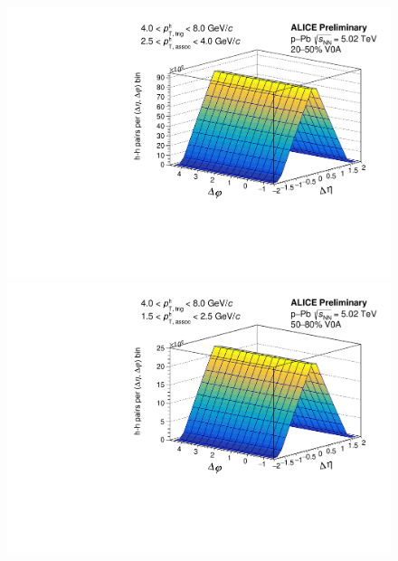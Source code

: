 \begin{figure}[ht]
\begin{minipage}{0.48\textwidth}
	\end{minipage}
	\begin{minipage}{0.48\textwidth}
		\includegraphics[width=\textwidth]{figures/analysis/h_h_2d_mixed_fancy_label_20_50_highpt.pdf}
	\end{minipage}
	\begin{minipage}{0.48\textwidth}
		\includegraphics[width=\textwidth]{figures/analysis/h_h_2d_mixed_fancy_label_50_80_lowpt.pdf}
	\end{minipage}
	\begin{minipage}{0.48\textwidth}

\end{minipage}
\end{figure}
